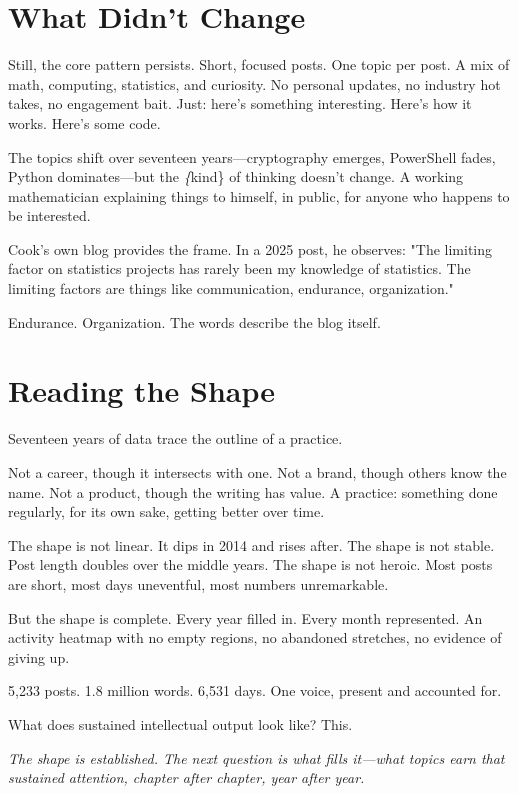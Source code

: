 \bigskip

\section*{What Didn't Change}

Still, the core pattern persists. Short, focused posts. One topic per post. A mix of math, computing, statistics, and curiosity. No personal updates, no industry hot takes, no engagement bait. Just: here's something interesting. Here's how it works. Here's some code.

The topics shift over seventeen years—cryptography emerges, PowerShell fades, Python dominates—but the \textit\{kind\} of thinking doesn't change. A working mathematician explaining things to himself, in public, for anyone who happens to be interested.

Cook's own blog provides the frame. In a 2025 post, he observes: "The limiting factor on statistics projects has rarely been my knowledge of statistics. The limiting factors are things like communication, endurance, organization."

Endurance. Organization. The words describe the blog itself.

\bigskip

\section*{Reading the Shape}

Seventeen years of data trace the outline of a practice.

Not a career, though it intersects with one. Not a brand, though others know the name. Not a product, though the writing has value. A practice: something done regularly, for its own sake, getting better over time.

The shape is not linear. It dips in 2014 and rises after. The shape is not stable. Post length doubles over the middle years. The shape is not heroic. Most posts are short, most days uneventful, most numbers unremarkable.

But the shape is complete. Every year filled in. Every month represented. An activity heatmap with no empty regions, no abandoned stretches, no evidence of giving up.

5,233 posts. 1.8 million words. 6,531 days. One voice, present and accounted for.

What does sustained intellectual output look like? This.

\textit{The shape is established. The next question is what fills it—what topics earn that sustained attention, chapter after chapter, year after year.}

